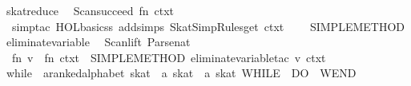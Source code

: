 \begin{isabellebody}
\isanewline
{}\isamarkupfalse%
\ skat{}reduce\ {}\ {}\isanewline
Scan{}succeed\ {}fn\ ctxt\ {}{}\isanewline
\ \ simp{}tac\ {}HOL{}basic{}ss\ addsimps\ SkatSimpRules{}get\ ctxt{}\ {}\isanewline
\ \ {}{}\ SIMPLE{}METHOD{}\isanewline
{}\isanewline
\isanewline
{}\isamarkupfalse%
\ eliminate{}variable\ {}\ {}\isanewline
Scan{}lift\ Parse{}nat\ {}{}\isanewline
\ \ {}fn\ v\ {}{}\ fn\ ctxt\ {}{}\ SIMPLE{}METHOD\ {}eliminate{}variable{}tac\ v\ ctxt\ {}{}{}\isanewline
{}%
\endisatagML
{\isafoldML}%
%
\isadelimML
\isanewline
%
\endisadelimML
\isanewline
{}\isamarkupfalse%
\ while\ {}{}\ {}{}a{}{}ranked{}alphabet\ skat\ {}\ {}a\ skat\ {}\ {}a\ skat{}\ {}{}WHILE\ {}\ DO\ {}\ WEND{}\ {}{}{}{}{}{}{}\ {}{}{}\ \isanewline

\end{isabellebody}

